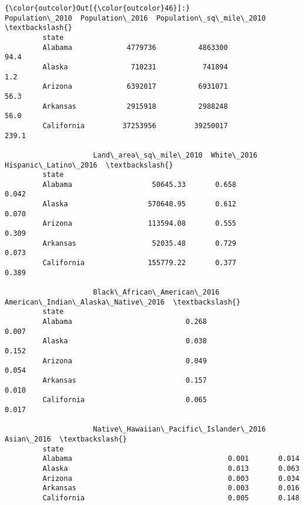\documentclass[11pt]{article}
\begin{document}
\begin{Verbatim}[commandchars=\\\{\}]
{\color{outcolor}Out[{\color{outcolor}46}]:}             Population\_2010  Population\_2016  Population\_sq\_mile\_2010  \textbackslash{}
         state                                                                   
         Alabama             4779736          4863300                     94.4   
         Alaska               710231           741894                      1.2   
         Arizona             6392017          6931071                     56.3   
         Arkansas            2915918          2988248                     56.0   
         California         37253956         39250017                    239.1   
         
                     Land\_area\_sq\_mile\_2010  White\_2016  Hispanic\_Latino\_2016  \textbackslash{}
         state                                                                  
         Alabama                   50645.33       0.658                 0.042   
         Alaska                   570640.95       0.612                 0.070   
         Arizona                  113594.08       0.555                 0.309   
         Arkansas                  52035.48       0.729                 0.073   
         California               155779.22       0.377                 0.389   
         
                     Black\_African\_American\_2016  American\_Indian\_Alaska\_Native\_2016  \textbackslash{}
         state                                                                         
         Alabama                           0.268                               0.007   
         Alaska                            0.038                               0.152   
         Arizona                           0.049                               0.054   
         Arkansas                          0.157                               0.010   
         California                        0.065                               0.017   
         
                     Native\_Hawaiian\_Pacific\_Islander\_2016  Asian\_2016  \textbackslash{}
         state                                                           
         Alabama                                     0.001       0.014   
         Alaska                                      0.013       0.063   
         Arizona                                     0.003       0.034   
         Arkansas                                    0.003       0.016   
         California                                  0.005       0.148   
         

\end{Verbatim}
\end{document}
